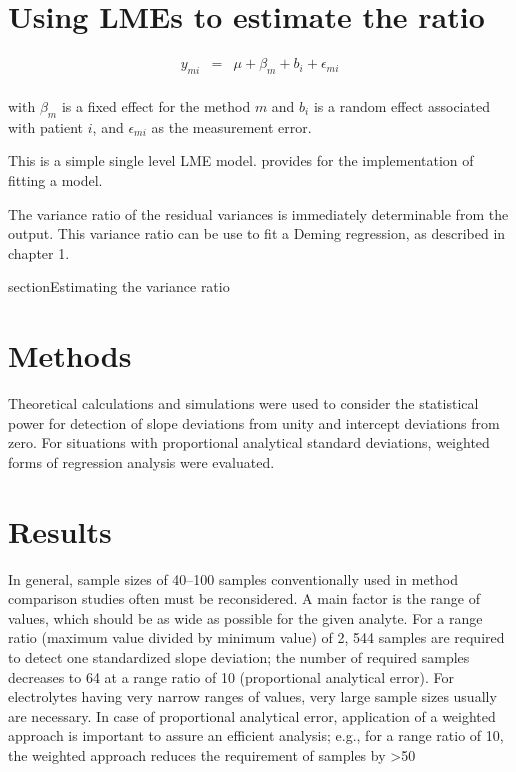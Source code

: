 \documentclass[12pt, a4paper]{report}
\theoremstyle{plain}
\theoremstyle{definition}
\theoremstyle{remark}
\begin{document}
\section{Using LMEs to estimate the ratio}

\begin{eqnarray*}
	y_{mi} &=& \mu + \beta_{m} + b_{i} + \epsilon_{mi}\\
\end{eqnarray*}

with $\beta_{m}$ is a fixed effect for the method $m$ and $b_{i}$
is a random effect associated with patient $i$, and
$\epsilon_{mi}$ as the measurement error.

This is a simple single level LME model. \citet{pb} provides for
the implementation of fitting a model.

The variance ratio of the residual variances is immediately
determinable from the output. This variance ratio can be use to
fit a Deming regression, as described in chapter 1.


\newpage
section{Estimating the variance ratio}




\section{Methods} 
Theoretical calculations and simulations were used to consider the statistical power for detection of slope deviations from 
unity and intercept deviations from zero. For situations with proportional analytical standard deviations, weighted forms of regression analysis were evaluated.

\section{Results} In general, sample sizes of 40–100 samples conventionally used in method comparison studies often must 
be reconsidered. A main factor is the range of values, which should be as wide as possible for the given analyte. 
For a range ratio (maximum value divided by minimum value) of 2, 544 samples are required to detect one standardized slope 
deviation; the number of required samples decreases to 64 at a range ratio of 10 (proportional analytical error). For electrolytes having very narrow ranges of values, very large sample sizes usually are necessary. In case of proportional analytical error, application of a weighted approach is important to assure an efficient analysis; e.g., for a range ratio of 10, the weighted approach reduces the requirement of samples by >50%
\end{document}
